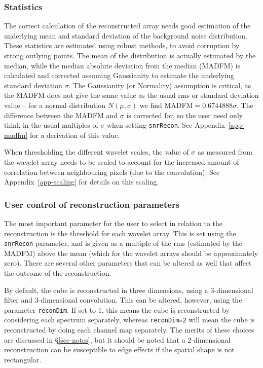 \documentclass[12pt,a4paper]{article}
\begin{document}
\subsubsection{Statistics}

The correct calculation of the reconstructed array needs good
estimation of the underlying mean and standard deviation of the
background noise distribution. These statistics are estimated using
robust methods, to avoid corruption by strong outlying points. The
mean of the distribution is actually estimated by the median, while
the median absolute deviation from the median (MADFM) is calculated
and corrected assuming Gaussianity to estimate the underlying standard
deviation $\sigma$. The Gaussianity (or Normality) assumption is
critical, as the MADFM does not give the same value as the usual rms
or standard deviation value -- for a normal distribution
$N(\mu,\sigma)$ we find MADFM$=0.6744888\sigma$. The difference
between the MADFM and $\sigma$ is corrected for, so the user need only
think in the usual multiples of $\sigma$ when setting
\texttt{snrRecon}. See Appendix~\ref{app-madfm} for a derivation of
this value.

When thresholding the different wavelet scales, the value of $\sigma$
as measured from the wavelet array needs to be scaled to account for the
increased amount of correlation between neighbouring pixels (due to
the convolution). See Appendix~\ref{app-scaling} for details on this
scaling. 

\subsubsection{User control of reconstruction parameters}

The most important parameter for the user to select in relation to the
reconstruction is the threshold for each wavelet array. This is set
using the \texttt{snrRecon} parameter, and is given as a multiple of the
rms (estimated by the MADFM) above the mean (which for the wavelet
arrays should be approximately zero). There are several other
parameters that can be altered as well that affect the outcome of the
reconstruction. 

By default, the cube is reconstructed in three dimensions, using a
3-dimensional filter and 3-dimensional convolution. This can be
altered, however, using the parameter \texttt{reconDim}. If set to 1,
this means the cube is reconstructed by considering each spectrum
separately, whereas \texttt{reconDim=2} will mean the cube is
reconstructed by doing each channel map separately. The merits of
these choices are discussed in \S\ref{sec-notes}, but it should be
noted that a 2-dimensional reconstruction can be susceptible to edge
effects if the spatial shape is not rectangular.
\end{document}
